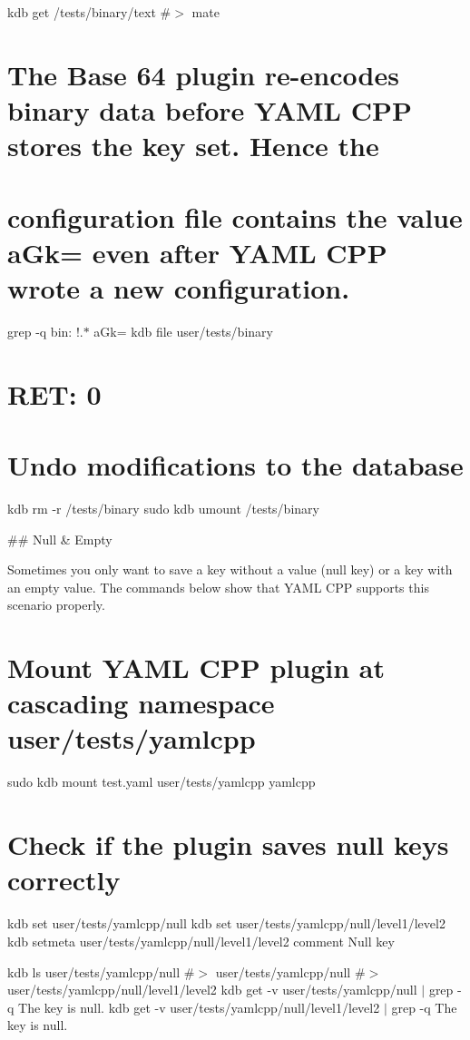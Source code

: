 kdb get /tests/binary/text \#$>$ mate

\section*{The Base 64 plugin re-\/encodes binary data before Y\+A\+ML C\+PP stores the key set. Hence the}

\section*{configuration file contains the value {\ttfamily a\+Gk=} even after Y\+A\+ML C\+PP wrote a new configuration.}

grep -\/q \textquotesingle{}bin\+: !.$\ast$ a\+Gk=\textquotesingle{} {\ttfamily kdb file user/tests/binary} \section*{R\+ET\+: 0}

\section*{Undo modifications to the database}

kdb rm -\/r /tests/binary sudo kdb umount /tests/binary 
\begin{DoxyCode}
## Null & Empty

Sometimes you only want to save a key without a value (null key) or a key with an empty value. The commands
       below show that YAML CPP supports this scenario properly.
\end{DoxyCode}
 \section*{Mount Y\+A\+ML C\+PP plugin at cascading namespace {\ttfamily user/tests/yamlcpp}}

sudo kdb mount test.\+yaml user/tests/yamlcpp yamlcpp

\section*{Check if the plugin saves null keys correctly}

kdb set user/tests/yamlcpp/null kdb set user/tests/yamlcpp/null/level1/level2 kdb setmeta user/tests/yamlcpp/null/level1/level2 comment \textquotesingle{}Null key\textquotesingle{}

kdb ls user/tests/yamlcpp/null \#$>$ user/tests/yamlcpp/null \#$>$ user/tests/yamlcpp/null/level1/level2 kdb get -\/v user/tests/yamlcpp/null $\vert$ grep -\/q \textquotesingle{}The key is null.\textquotesingle{} kdb get -\/v user/tests/yamlcpp/null/level1/level2 $\vert$ grep -\/q \textquotesingle{}The key is null.\textquotesingle{}

